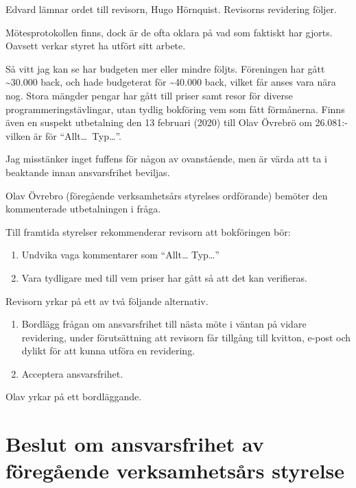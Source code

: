 \documentclass[a4paper]{article}
\begin{document}
Edvard lämnar ordet till revisorn, Hugo Hörnquist. Revisorns revidering
följer.

\begin{displayquote}
  Mötesprotokollen finns, dock är de ofta oklara på vad som
  faktiskt har gjorts. Oavsett verkar styret ha utfört sitt
  arbete.

  Så vitt jag kan se har budgeten mer eller mindre följts.
  Föreningen har gått \textasciitilde{}30.000 back, och hade budgeterat för
  \textasciitilde{}40.000 back, vilket får anses vara nära nog. Stora mängder
  pengar har gått till priser samt resor för diverse
  programmeringstävlingar, utan tydlig bokföring vem som fått
  förmånerna. Finns även en suspekt utbetalning den 13
  februari (2020) till Olav Övrebrö om 26.081:- vilken är för
  ``Allt\ldots \ Typ\ldots''.

  Jag misstänker inget fuffens för någon av ovanstående, men
  är värda att ta i beaktande innan ansvarsfrihet beviljas.
\end{displayquote}

Olav Övrebro (föregående verksamhetsårs styrelses ordförande) bemöter den
kommenterade utbetalningen i fråga.

Till framtida styrelser rekommenderar revisorn att bokföringen bör:

\begin{enumerate}
\def\labelenumi{\arabic{enumi}.}
\item
  Undvika vaga kommentarer som ``Allt\ldots{} Typ\ldots{}''
\item
  Vara tydligare med till vem priser har gått så att det kan verifieras.
\end{enumerate}

Revisorn yrkar på ett av två följande alternativ.

\begin{enumerate}
\def\labelenumi{\arabic{enumi}.}
\item
  Bordlägg frågan om ansvarsfrihet till nästa möte i väntan på vidare
  revidering, under förutsättning att revisorn får tillgång till
  kvitton, e-post och dylikt för att kunna utföra en revidering.
\item
  Acceptera ansvarsfrihet.
\end{enumerate}

Olav yrkar på ett bordläggande.

\hypertarget{beslut-om-ansvarsfrihet-av-fuxf6reguxe5ende-verksamhetsuxe5rs-styrelse}{%
\section{Beslut om ansvarsfrihet av föregående verksamhetsårs
styrelse}\label{beslut-om-ansvarsfrihet-av-fuxf6reguxe5ende-verksamhetsuxe5rs-styrelse}}
\end{document}
